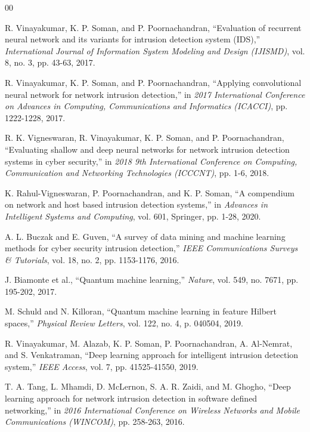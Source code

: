 \documentclass[conference]{IEEEtran}
\begin{document}
\begin{thebibliography}{00}

 R. Vinayakumar, K. P. Soman, and P. Poornachandran, ``Evaluation of recurrent neural network and its variants for intrusion detection system (IDS),'' \textit{International Journal of Information System Modeling and Design (IJISMD)}, vol. 8, no. 3, pp. 43-63, 2017.

 R. Vinayakumar, K. P. Soman, and P. Poornachandran, ``Applying convolutional neural network for network intrusion detection,'' in \textit{2017 International Conference on Advances in Computing, Communications and Informatics (ICACCI)}, pp. 1222-1228, 2017.

 R. K. Vigneswaran, R. Vinayakumar, K. P. Soman, and P. Poornachandran, ``Evaluating shallow and deep neural networks for network intrusion detection systems in cyber security,'' in \textit{2018 9th International Conference on Computing, Communication and Networking Technologies (ICCCNT)}, pp. 1-6, 2018.

 K. Rahul-Vigneswaran, P. Poornachandran, and K. P. Soman, ``A compendium on network and host based intrusion detection systems,'' in \textit{Advances in Intelligent Systems and Computing}, vol. 601, Springer, pp. 1-28, 2020.

 A. L. Buczak and E. Guven, ``A survey of data mining and machine learning methods for cyber security intrusion detection,'' \textit{IEEE Communications Surveys \& Tutorials}, vol. 18, no. 2, pp. 1153-1176, 2016.

 J. Biamonte et al., ``Quantum machine learning,'' \textit{Nature}, vol. 549, no. 7671, pp. 195-202, 2017.

 M. Schuld and N. Killoran, ``Quantum machine learning in feature Hilbert spaces,'' \textit{Physical Review Letters}, vol. 122, no. 4, p. 040504, 2019.

 R. Vinayakumar, M. Alazab, K. P. Soman, P. Poornachandran, A. Al-Nemrat, and S. Venkatraman, ``Deep learning approach for intelligent intrusion detection system,'' \textit{IEEE Access}, vol. 7, pp. 41525-41550, 2019.

 T. A. Tang, L. Mhamdi, D. McLernon, S. A. R. Zaidi, and M. Ghogho, ``Deep learning approach for network intrusion detection in software defined networking,'' in \textit{2016 International Conference on Wireless Networks and Mobile Communications (WINCOM)}, pp. 258-263, 2016.


\end{thebibliography}
\end{document}

